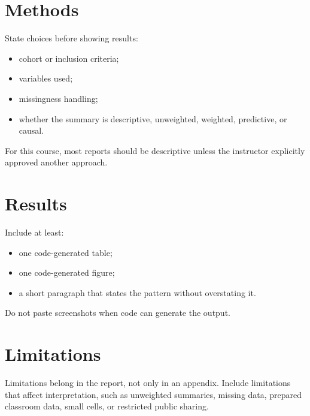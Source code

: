 \documentclass[
  letterpaper,
  DIV=11,
  numbers=noendperiod,
  oneside]{scrreprt}
\providecommand{\tightlist}{%
  \setlength{\itemsep}{0pt}\setlength{\parskip}{0pt}}
\begin{document}
\section*{Methods}\label{methods}


State choices before showing results:

\begin{itemize}
\tightlist
\item
  cohort or inclusion criteria;
\item
  variables used;
\item
  missingness handling;
\item
  whether the summary is descriptive, unweighted, weighted, predictive,
  or causal.
\end{itemize}

For this course, most reports should be descriptive unless the
instructor explicitly approved another approach.

\section*{Results}\label{results}


Include at least:

\begin{itemize}
\tightlist
\item
  one code-generated table;
\item
  one code-generated figure;
\item
  a short paragraph that states the pattern without overstating it.
\end{itemize}

Do not paste screenshots when code can generate the output.

\section*{Limitations}\label{limitations}


Limitations belong in the report, not only in an appendix. Include
limitations that affect interpretation, such as unweighted summaries,
missing data, prepared classroom data, small cells, or restricted public
sharing.
\end{document}
